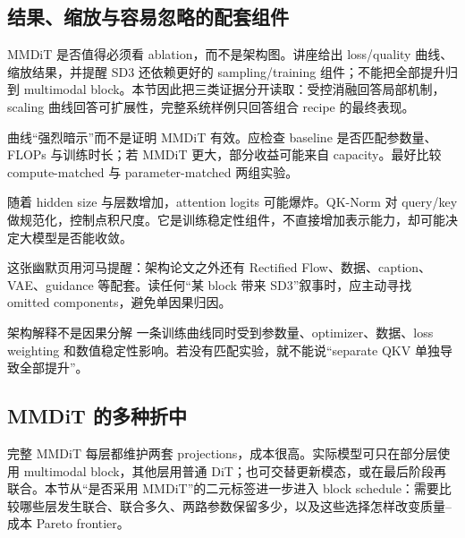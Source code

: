 \subsection{结果、缩放与容易忽略的配套组件}

MMDiT 是否值得必须看 ablation，而不是架构图。讲座给出 loss/quality 曲线、缩放结果，并提醒 SD3 还依赖更好的 sampling/training 组件；不能把全部提升归到 multimodal block。本节因此把三类证据分开读取：受控消融回答局部机制，scaling 曲线回答可扩展性，完整系统样例只回答组合 recipe 的最终表现。


曲线“强烈暗示”而不是证明 MMDiT 有效。应检查 baseline 是否匹配参数量、FLOPs 与训练时长；若 MMDiT 更大，部分收益可能来自 capacity。最好比较 compute-matched 与 parameter-matched 两组实验。


随着 hidden size 与层数增加，attention logits 可能爆炸。QK-Norm 对 query/key 做规范化，控制点积尺度。它是训练稳定性组件，不直接增加表示能力，却可能决定大模型是否能收敛。


这张幽默页用河马提醒：架构论文之外还有 Rectified Flow、数据、caption、VAE、guidance 等配套。读任何“某 block 带来 SD3”叙事时，应主动寻找 omitted components，避免单因果归因。


\begin{warningbox}{架构解释不是因果分解}
一条训练曲线同时受到参数量、optimizer、数据、loss weighting 和数值稳定性影响。若没有匹配实验，就不能说“separate QKV 单独导致全部提升”。
\end{warningbox}

\subsection{MMDiT 的多种折中}

完整 MMDiT 每层都维护两套 projections，成本很高。实际模型可只在部分层使用 multimodal block，其他层用普通 DiT；也可交替更新模态，或在最后阶段再联合。本节从“是否采用 MMDiT”的二元标签进一步进入 block schedule：需要比较哪些层发生联合、联合多久、两路参数保留多少，以及这些选择怎样改变质量--成本 Pareto frontier。

